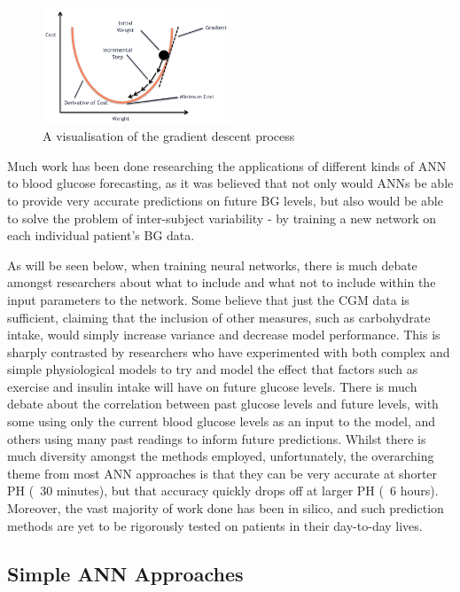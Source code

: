       \begin{figure}[H]
        \centering
        \includegraphics[width=0.5\textwidth]{images/gradientdescent.png}
        \caption{
         A visualisation of the gradient descent process\cite{whatisgdimage}
        }
      \end{figure}
      Much work has been done researching the applications of different kinds of ANN to blood glucose forecasting, as it was believed that not only would ANNs be able to provide very accurate predictions on future BG levels, but also would be able to solve the problem of inter-subject variability - by training a new network on each individual patient's BG data. 

      As will be seen below, when training neural networks, there is much debate amongst researchers about what to include and what not to include within the input parameters to the network. Some believe that just the CGM data is sufficient, claiming that the inclusion of other measures, such as carbohydrate intake, would simply increase variance and decrease model performance. This is sharply contrasted by researchers who have experimented with both complex and simple physiological models to try and model the effect that factors such as exercise and insulin intake will have on future glucose levels. There is much debate about the correlation between past glucose levels and future levels, with some using only the current blood glucose levels as an input to the model, and others using many past readings to inform future predictions. Whilst there is much diversity amongst the methods employed, unfortunately, the overarching theme from most ANN approaches is that they can be very accurate at shorter PH (~30 minutes), but that accuracy quickly drops off at larger PH (~6 hours). Moreover, the vast majority of work done has been in silico, and such prediction methods are yet to be rigorously tested on patients in their day-to-day lives.

      \subsection{Simple ANN Approaches}

